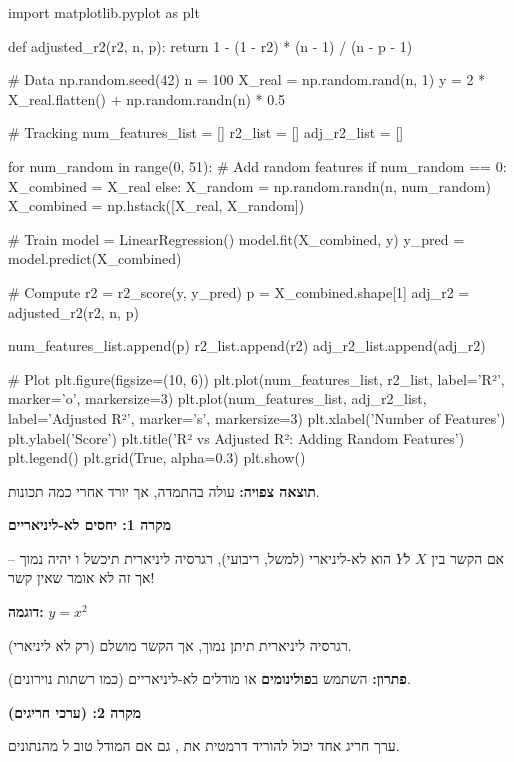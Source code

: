 \begin{pythonbox}
import matplotlib.pyplot as plt

def adjusted_r2(r2, n, p):
    return 1 - (1 - r2) * (n - 1) / (n - p - 1)

# Data
np.random.seed(42)
n = 100
X_real = np.random.rand(n, 1)
y = 2 * X_real.flatten() + np.random.randn(n) * 0.5

# Tracking
num_features_list = []
r2_list = []
adj_r2_list = []

for num_random in range(0, 51):
    # Add random features
    if num_random == 0:
        X_combined = X_real
    else:
        X_random = np.random.randn(n, num_random)
        X_combined = np.hstack([X_real, X_random])

    # Train
    model = LinearRegression()
    model.fit(X_combined, y)
    y_pred = model.predict(X_combined)

    # Compute
    r2 = r2_score(y, y_pred)
    p = X_combined.shape[1]
    adj_r2 = adjusted_r2(r2, n, p)

    num_features_list.append(p)
    r2_list.append(r2)
    adj_r2_list.append(adj_r2)

# Plot
plt.figure(figsize=(10, 6))
plt.plot(num_features_list, r2_list, label='R²', marker='o', markersize=3)
plt.plot(num_features_list, adj_r2_list, label='Adjusted R²', marker='s', markersize=3)
plt.xlabel('Number of Features')
plt.ylabel('Score')
plt.title('R² vs Adjusted R²: Adding Random Features')
plt.legend()
plt.grid(True, alpha=0.3)
plt.show()
\end{pythonbox}

\textbf{תוצאה צפויה:} \Rsquared{} עולה בהתמדה, אך  יורד אחרי כמה תכונות.


\textbf{מקרה \num{1}: יחסים לא-ליניאריים}

אם הקשר בין $X$ ל\en{-}$Y$ הוא לא-ליניארי (למשל, ריבועי), רגרסיה ליניארית תיכשל ו\en{-}\Rsquared{} יהיה נמוך – אך זה לא אומר שאין קשר!

\textbf{דוגמה:} $y = x^2$

רגרסיה ליניארית תיתן \Rsquared{} נמוך, אך הקשר מושלם (רק לא ליניארי).

\textbf{פתרון:} השתמש ב\textbf{פולינומים} או מודלים לא-ליניאריים (כמו רשתות נוירונים).

\textbf{מקרה \num{2}:  (ערכי חריגים)}

ערך חריג אחד יכול להוריד דרמטית את \Rsquared{}, גם אם המודל טוב ל\en{-} מהנתונים.

